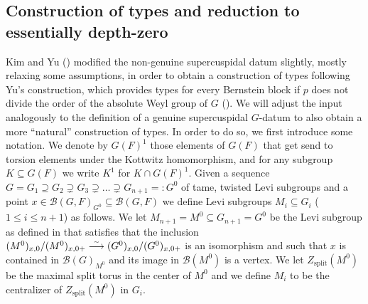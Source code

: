 \documentclass{article}
\def\simto{\buildrel\hbox{\tiny{$\sim$}}\over\longrightarrow}
\newcommand{\cB}{\mathcal{B}}
\theoremstyle{definition}
\numberwithin{equation}{subsection}
\renewcommand{\-}{\hyp{}}
\begin{document}
\subsection{Construction of types and reduction to essentially depth-zero} \label{sub:types}
Kim and Yu (\cite{KimYu}) modified the non-genuine supercuspidal datum slightly, mostly relaxing some assumptions, in order to obtain a construction of types following Yu's construction, which provides types for every Bernstein block if $p$ does not divide the order of the absolute Weyl group of $G$ (\cite{Kim07, Fin21}). We will adjust the input analogously to the definition of a genuine supercuspidal $G$-datum to also obtain a more ``natural'' construction of types. In order to do so, we first introduce some notation. 
We denote by $G(F)^1$ those elements of $G(F)$ that get send to torsion elements under the Kottwitz homomorphism, 
and for any subgroup $K\subseteq G(F)$ we write $K^1$ for $K \cap G(F)^1$.
Given a sequence $G=G_1 \supseteq G_2 \supsetneq G_3 \supsetneq \hdots \supsetneq G_{n+1}=:G^0$ of tame, twisted Levi subgroups and a point $x \in \cB(G,F)_{G^0} \subseteq \cB(G,F)$ we define Levi subgroups $M_i \subseteq G_i$ ($1 \leq i \leq n+1$) as follows. We let $M_{n+1}=M^0 \subseteq G_{n+1}=G^0$ be the Levi subgroup as defined in \cite[\S6.3]{MP96} that satisfies that the inclusion $(M^0)_{x,0}/(M^0)_{x,0+}\simto (G^0)_{x,0}/(G^0)_{x,0+}$ is an isomorphism and such that $x$ is contained in $\cB(G)_{M^0}$ and its image in $\cB(M^0)$ is a vertex. We let $Z_{\mathrm{split}}(M^0)$ be the maximal split torus in the center of $M^0$ and we define $M_i$ to be the centralizer of $Z_{\mathrm{split}}(M^0)$ in $G_i$.
\end{document}

